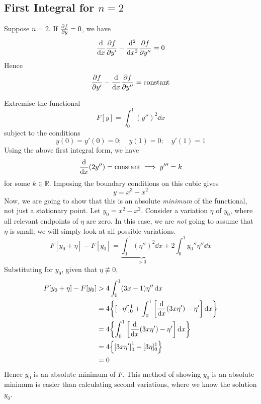 \subsection{First Integral for \( n = 2 \)}
Suppose \( n = 2 \).
If \(\pdv{f}{y} = 0\), we have
\[
	\dv{x}\pdv{f}{y'} - \dv[2]{x}\pdv{f}{y''} = 0
\]
Hence
\[
	\pdv{f}{y'} - \dv{x}\pdv{f}{y''} = \text{constant}
\]

\begin{example}
	Extremise the functional
	\[
		F[y] = \int_0^1 (y'')^2 \dd{x}
	\]
	subject to the conditions
	\[
		y(0) = y'(0) = 0;\quad y(1) = 0;\quad y'(1) = 1
	\]
	Using the above first integral form, we have
	\[
		\dv{x}(2y'') = \text{constant} \implies y''' = k
	\]
	for some \( k \in \mathbb R \).
	Imposing the boundary conditions on this cubic gives
	\[
		y = x^3 - x^2
	\]
	Now, we are going to show that this is an absolute \textit{minimum} of the functional, not just a stationary point.
	Let \( y_0 = x^2 - x^2 \).
	Consider a variation \( \eta \) of \( y_0 \), where all relevant endpoints of \( \eta \) are zero.
	In this case, we are \textit{not} going to assume that \( \eta \) is small; we will simply look at all possible variations.
	\[
		F[y_0 + \eta] - F[y_0] = \underbrace{\int_0^1 (\eta'')^2 \dd{x}}_{> 0} + 2\int_0^1 y_0'' \eta'' \dd{x}
	\]
	Substituting for \( y_0 \), given that \( \eta \not\equiv 0 \),
	\begin{align*}
		F[y_0 + \eta] - F[y_0] & > 4 \int_0^1 (3x-1)\eta'' \dd{x}                                    \\
		                       & = 4\qty{[-\eta']_0^1 + \int_0^1\qty[\dv{x}(3x\eta') - \eta']\dd{x}} \\
		                       & = 4\qty{\int_0^1\qty[\dv{x}(3x\eta') - \eta']\dd{x}}                \\
		                       & = 4\qty{\qty[3x\eta']_0^1 - [3\eta]_0^1}                            \\
		                       & = 0
	\end{align*}
	Hence \( y_0 \) is an absolute minimum of \( F \).
	This method of showing \( y_0 \) is an absolute minimum is easier than calculating second variations, where we know the solution \( y_0 \).
\end{example}

